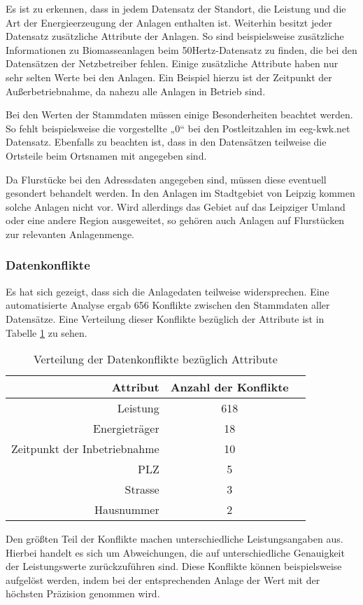 \documentclass[a4paper,11pt]{article}
\begin{document}
Es ist zu erkennen, dass in jedem Datensatz der Standort, die Leistung und die
Art der Energieerzeugung der Anlagen enthalten ist. Weiterhin besitzt jeder
Datensatz zusätzliche Attribute der Anlagen. So sind beispielsweise
zusätzliche Informationen zu Biomasseanlagen beim 50Hertz-Datensatz zu finden,
die bei den Datensätzen der Netzbetreiber fehlen. Einige zusätzliche Attribute
haben nur sehr selten Werte bei den Anlagen. Ein Beispiel hierzu ist der
Zeitpunkt der Außerbetriebnahme, da nahezu alle Anlagen in Betrieb sind.
 
Bei den Werten der Stammdaten müssen einige Besonderheiten beachtet werden. So
fehlt beispielsweise die vorgestellte „0“ bei den Postleitzahlen im
eeg-kwk.net Datensatz. Ebenfalls zu beachten ist, dass in den Datensätzen
teilweise die Ortsteile beim Ortsnamen mit angegeben sind.  

Da Flurstücke bei den Adressdaten angegeben sind, müssen diese eventuell
gesondert behandelt werden. In den Anlagen im Stadtgebiet von Leipzig kommen
solche Anlagen nicht vor. Wird allerdings das Gebiet auf das Leipziger Umland
oder eine andere Region ausgeweitet, so gehören auch Anlagen auf Flurstücken
zur relevanten Anlagenmenge.     

\subsubsection{Datenkonflikte}
Es hat sich gezeigt, dass sich die Anlagedaten teilweise widersprechen. Eine
automatisierte Analyse ergab 656 Konflikte zwischen den Stammdaten aller
Datensätze. Eine Verteilung dieser Konflikte bezüglich der Attribute ist in
Tabelle \ref{tab:konflikte} zu sehen.  

\begin{table}[ht]
\centering
\begin{tabular}[h]{r|c|c}
Attribut & Anzahl der Konflikte \\\hline
Leistung & 618   \\\hline
Energieträger & 18   \\\hline
Zeitpunkt der Inbetriebnahme & 10   \\\hline
PLZ & 5   \\\hline
Strasse & 3   \\\hline
Hausnummer & 2  
\end{tabular}
\caption{Verteilung der Datenkonflikte bezüglich Attribute}
\label{tab:konflikte}
\end{table}

Den größten Teil der Konflikte machen unterschiedliche Leistungsangaben aus.
Hierbei handelt es sich um Abweichungen, die auf unterschiedliche Genauigkeit
der Leistungswerte zurückzuführen sind. Diese Konflikte können beispielsweise
aufgelöst werden, indem bei der entsprechenden Anlage der Wert mit der
höchsten Präzision genommen wird.
\end{document}
